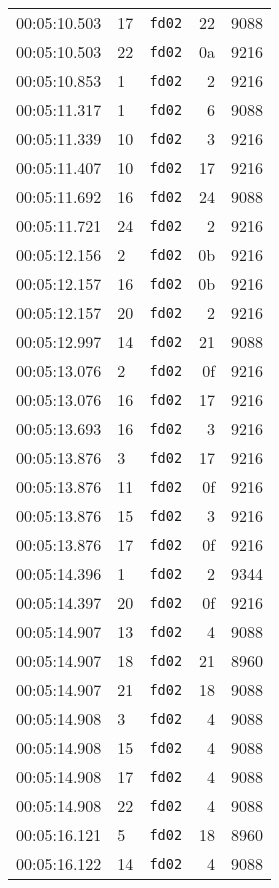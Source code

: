 \documentclass{article}
\begin{document}
\begin{longtable}{lllrr}
00:05:10.503 & 17 & \texttt{fd02} & 22 & 9088 \\
00:05:10.503 & 22 & \texttt{fd02} & 0a & 9216 \\
00:05:10.853 & 1 & \texttt{fd02} & 2 & 9216 \\
00:05:11.317 & 1 & \texttt{fd02} & 6 & 9088 \\
00:05:11.339 & 10 & \texttt{fd02} & 3 & 9216 \\
00:05:11.407 & 10 & \texttt{fd02} & 17 & 9216 \\
00:05:11.692 & 16 & \texttt{fd02} & 24 & 9088 \\
00:05:11.721 & 24 & \texttt{fd02} & 2 & 9216 \\
00:05:12.156 & 2 & \texttt{fd02} & 0b & 9216 \\
00:05:12.157 & 16 & \texttt{fd02} & 0b & 9216 \\
00:05:12.157 & 20 & \texttt{fd02} & 2 & 9216 \\
00:05:12.997 & 14 & \texttt{fd02} & 21 & 9088 \\
00:05:13.076 & 2 & \texttt{fd02} & 0f & 9216 \\
00:05:13.076 & 16 & \texttt{fd02} & 17 & 9216 \\
00:05:13.693 & 16 & \texttt{fd02} & 3 & 9216 \\
00:05:13.876 & 3 & \texttt{fd02} & 17 & 9216 \\
00:05:13.876 & 11 & \texttt{fd02} & 0f & 9216 \\
00:05:13.876 & 15 & \texttt{fd02} & 3 & 9216 \\
00:05:13.876 & 17 & \texttt{fd02} & 0f & 9216 \\
00:05:14.396 & 1 & \texttt{fd02} & 2 & 9344 \\
00:05:14.397 & 20 & \texttt{fd02} & 0f & 9216 \\
00:05:14.907 & 13 & \texttt{fd02} & 4 & 9088 \\
00:05:14.907 & 18 & \texttt{fd02} & 21 & 8960 \\
00:05:14.907 & 21 & \texttt{fd02} & 18 & 9088 \\
00:05:14.908 & 3 & \texttt{fd02} & 4 & 9088 \\
00:05:14.908 & 15 & \texttt{fd02} & 4 & 9088 \\
00:05:14.908 & 17 & \texttt{fd02} & 4 & 9088 \\
00:05:14.908 & 22 & \texttt{fd02} & 4 & 9088 \\
00:05:16.121 & 5 & \texttt{fd02} & 18 & 8960 \\
00:05:16.122 & 14 & \texttt{fd02} & 4 & 9088 \\

\end{longtable}
\end{document}

